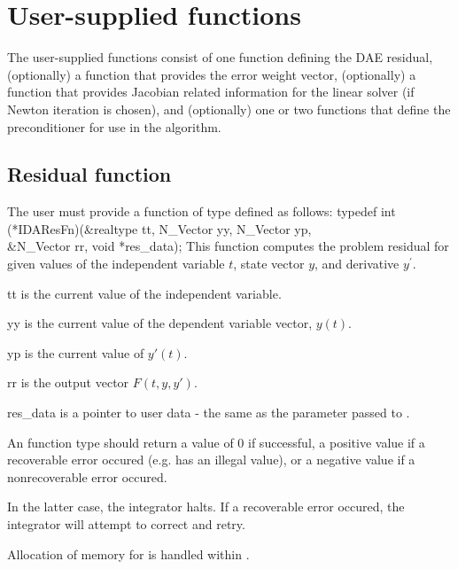 \section{User-supplied functions}\label{ss:user_fct_sim}

The user-supplied functions consist of one function defining the DAE residual,
(optionally) a function that provides the error weight vector,
(optionally) a function that provides Jacobian related information for the linear 
solver (if Newton iteration is chosen), and (optionally) one or two functions 
that define the preconditioner for use in the {\spgmr} algorithm. 
\subsection{Residual function}\label{ss:resFn}
The user must provide a function of type  defined as follows:
{
  typedef int (*IDAResFn)(&realtype tt, N\_Vector yy, N\_Vector yp,  \\
                          &N\_Vector rr, void *res\_data);
}
{
  This function computes the problem residual for given values
  of the independent variable $t$, state vector $y$, and derivative $y^\prime$.
}
{
  \begin{args}
  \item[tt]
    is the current value of the independent variable.
  \item[yy]
    is the current value of the dependent variable vector, $y(t)$.
  \item[yp]
    is the current value of $y'(t)$.
  \item[rr]
    is the output vector $F(t,y,y')$.
  \item[res\_data]
    is a pointer to user data - the same as the       
    parameter passed to .   
  \end{args}
}
{
  An  function type should return a value of $0$ if successful, 
  a positive value if a recoverable error occured (e.g.  has an illegal value),
  or a negative value if a nonrecoverable error occured. 

  In the latter case, the integrator halts. 
  If a recoverable error occured, the integrator will attempt to correct and retry.
}
{
  Allocation of memory for  is handled within {\ida}.
}
